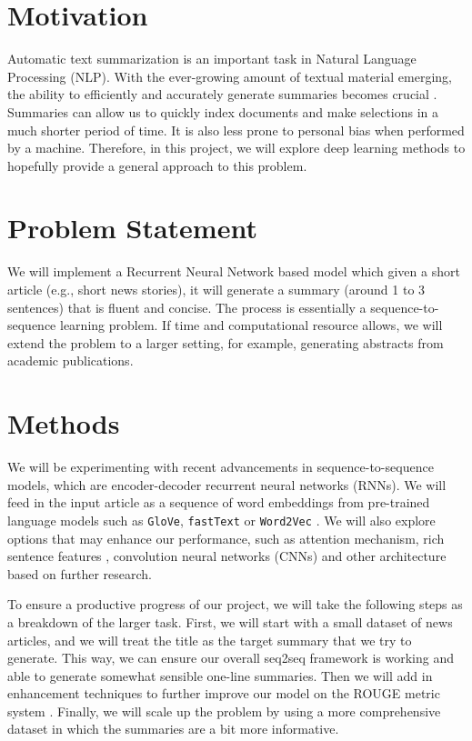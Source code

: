 \section{Motivation}
Automatic text summarization is an important task in Natural Language Processing (NLP). With the ever-growing amount of textual material emerging, the ability to efficiently and accurately generate summaries becomes crucial \cite{gambhir2017recent}. Summaries can allow us to quickly index documents and make selections in a much shorter period of time. It is also less prone to personal bias when performed by a machine. Therefore, in this project, we will explore deep learning methods to hopefully provide a general approach to this problem.

\section{Problem Statement}
We will implement a Recurrent Neural Network based model which given a short article (e.g., short news stories), it will generate a summary (around 1 to 3 sentences) that is fluent and concise. The process is essentially a sequence-to-sequence learning problem. If time and computational resource allows, we will extend the problem to a larger setting, for example, generating abstracts from academic publications. 


\section{Methods}
We will be experimenting with recent advancements in sequence-to-sequence models, which are encoder-decoder recurrent neural networks (RNNs). We will feed in the input article as a sequence of word embeddings from pre-trained language models such as \texttt{GloVe}, \texttt{fastText} or \texttt{Word2Vec} \cite{pennington2014glove, bojanowski2017enriching, mikolov2013efficient}. We will also explore options that may enhance our performance, such as attention mechanism, rich sentence features \cite{nallapati2016abstractive}, convolution neural networks (CNNs) and other architecture based on further research.  

To ensure a productive progress of our project, we will take the following steps as a breakdown of the larger task. First, we will start with a small dataset of news articles, and we will treat the title as the target summary that we try to generate. This way, we can ensure our overall seq2seq framework is working and able to generate somewhat sensible one-line summaries. Then we will add in enhancement techniques to further improve our model on the ROUGE metric system \cite{lin2004rouge}. Finally, we will scale up the problem by using a more comprehensive dataset in which the summaries are a bit more informative. 

